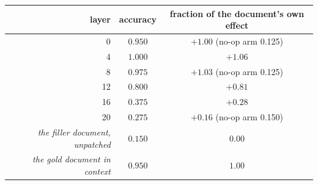 \begin{tabular}{@{}rcc@{}}
\toprule
\rowcolor{TableHeader}
layer & accuracy & fraction of the document's own effect \\
\midrule
0 & $0.950$ & $+1.00$ \quad\tiny(no-op arm 0.125) \\
4 & $1.000$ & $+1.06$ \\
8 & $0.975$ & $+1.03$ \quad\tiny(no-op arm 0.125) \\
12 & $0.800$ & $+0.81$ \\
16 & $0.375$ & $+0.28$ \\
20 & $0.275$ & $+0.16$ \quad\tiny(no-op arm 0.150) \\
\midrule
\emph{the filler document, unpatched} & $0.150$ & $0.00$ \\
\emph{the gold document in context} & $0.950$ & $1.00$ \\
\bottomrule
\end{tabular}
